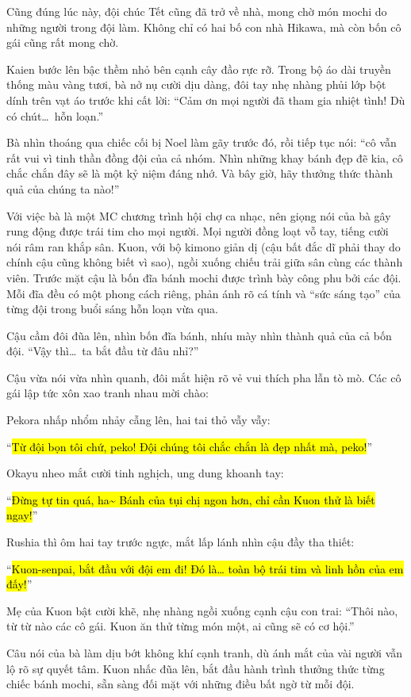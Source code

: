 \documentclass[../main.tex]{subfiles}
\begin{document}
Cũng đúng lúc này, đội chúc Tết cũng đã trở về nhà, mong chờ món mochi do những người trong đội làm. Không chỉ có hai bố con nhà Hikawa, mà còn bốn cô gái cũng rất mong chờ.

Kaien bước lên bậc thềm nhỏ bên cạnh cây đầo rực rỡ. Trong bộ áo dài truyền thống màu vàng tươi, bà nở nụ cười dịu dàng, đôi tay nhẹ nhàng phủi lớp bột dính trên vạt áo trước khi cất lời: ``Cảm ơn mọi người đã tham gia nhiệt tình! Dù có chút\dots\ hỗn loạn.''

Bà nhìn thoáng qua chiếc cối bị Noel làm gãy trước đó, rồi tiếp tục nói: ``cô vẫn rất vui vì tinh thần đồng đội của cả nhóm. Nhìn những khay bánh đẹp đẽ kia, cô chắc chắn đây sẽ là một kỷ niệm đáng nhớ. Và bây giờ, hãy thưởng thức thành quả của chúng ta nào!''

Với việc bà là một MC chương trình hội chợ ca nhạc, nên giọng nói của bà gây rung động được trái tim cho mọi người. Mọi người đồng loạt vỗ tay, tiếng cười nói râm ran khắp sân. Kuon, với bộ kimono giản dị (cậu bất đắc dĩ phải thay do chính cậu cũng không biết vì sao), ngồi xuống chiếu trải giữa sân cùng các thành viên. Trước mặt cậu là bốn đĩa bánh mochi được trình bày công phu bởi các đội. Mỗi đĩa đều có một phong cách riêng, phản ánh rõ cá tính và ``sức sáng tạo'' của từng đội trong buổi sáng hỗn loạn vừa qua.

Cậu cầm đôi đũa lên, nhìn bốn đĩa bánh, nhíu mày nhìn thành quả của cả bốn đội. ``Vậy thì\dots\ ta bắt đầu từ đâu nhỉ?''

Cậu vừa nói vừa nhìn quanh, đôi mắt hiện rõ vẻ vui thích pha lẫn tò mò. Các cô gái lập tức xôn xao tranh nhau mời chào:

Pekora nhấp nhổm nhảy cẫng lên, hai tai thỏ vẫy vẫy:

``\hl{Từ đội bọn tôi chứ, peko! Đội chúng tôi chắc chắn là đẹp nhất mà, peko!}''

Okayu nheo mắt cười tinh nghịch, ung dung khoanh tay:

``\hl{Đừng tự tin quá, ha\~{} Bánh của tụi chị ngon hơn, chỉ cần Kuon thử là biết ngay!}''

Rushia thì ôm hai tay trước ngực, mắt lấp lánh nhìn cậu đầy tha thiết:

``\hl{Kuon-senpai, bắt đầu với đội em đi! Đó là\dots{} toàn bộ trái tim và linh hồn của em đấy!}''

Mẹ của Kuon bật cười khẽ, nhẹ nhàng ngồi xuống cạnh cậu con trai: ``Thôi nào, từ từ nào các cô gái. Kuon ăn thử từng món một, ai cũng sẽ có cơ hội.''

Câu nói của bà làm dịu bớt không khí cạnh tranh, dù ánh mắt của vài người vẫn lộ rõ sự quyết tâm. Kuon nhấc đũa lên, bắt đầu hành trình thưởng thức từng chiếc bánh mochi, sẵn sàng đối mặt với những điều bất ngờ từ mỗi đội.
\end{document}
